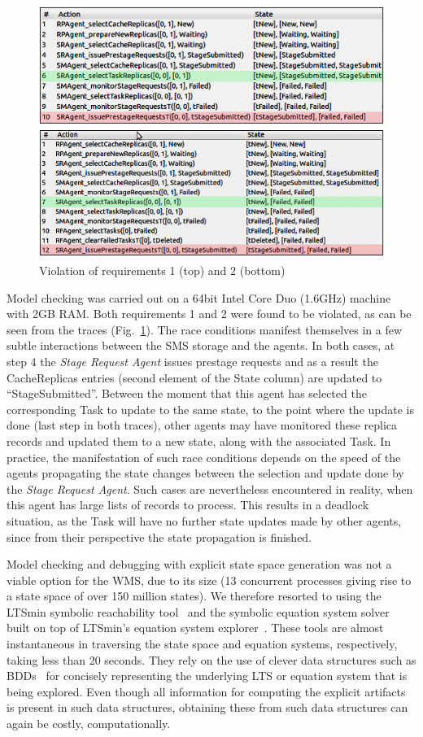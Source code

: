 \documentclass[sort&compress,preprint,3p]{elsarticle}
\begin{document}
\begin{figure}[tp]
\includegraphics[width=0.7\linewidth,keepaspectratio=true]{./graphics/Figure9.png}
\centering
\caption{Violation of requirements 1 (top) and 2 (bottom)}
\label{fig:PropertyViolation}
\end{figure}
Model checking was carried out on a 64bit Intel Core Duo (1.6GHz) machine with 2GB RAM. 
Both requirements 1 and 2 were found to be violated, as can be seen from the traces (Fig.~\ref{fig:PropertyViolation}).
The race conditions manifest themselves in a few subtle interactions between the SMS storage and the agents.
In both cases, at step 4 the \textit{Stage Request Agent} issues prestage requests and 
as a result the CacheReplicas entries (second element of the State column) are updated to ``StageSubmitted''. Between the moment
that this agent has selected the corresponding Task to update to the same state,
to the point where the update is done (last step in both traces),
other agents may have monitored these replica records and updated
them to a new state, along with the associated Task. In practice, the manifestation
of such race conditions depends on the speed of the agents propagating the
state changes between the selection and update done by the \textit{Stage Request Agent}.
Such cases are nevertheless encountered in reality, when this agent
has large lists of records to process. This results in a deadlock situation, as 
the Task will have no further state updates made by other agents, since
from their perspective the state propagation is finished.

Model checking and debugging with explicit state space generation was not
a viable option for the WMS, due to its size (13 concurrent processes
giving rise to a state space of over 150 million states). We therefore
resorted to using the LTSmin symbolic reachability tool~\cite{BP:08} and
the symbolic equation system solver built on top of LTSmin's equation
system explorer~\cite{KP:12}.  These tools are almost instantaneous
in traversing the state space and equation systems, respectively,
taking less than 20 seconds. They rely on the use of clever data
structures such as BDDs~\cite{BCMDH:90} for concisely representing the
underlying LTS or equation system that is being explored. Even though
all information for computing the explicit artifacts is present in such
data structures,  obtaining these from such data structures can again
be costly, computationally.
\end{document}
